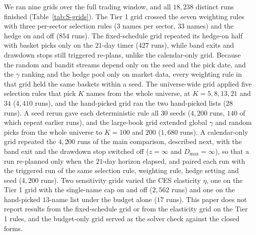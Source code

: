 We ran nine grids over the full trading window, and all $18{,}238$ distinct runs finished
(Table~\ref{tab:S-grids}). The Tier 1 grid crossed the seven weighting rules with three per-sector selection rules
($3$ names per sector, $33$ names) and the hedge on and off ($854$ runs). The fixed-schedule grid repeated its
hedge-on half with basket picks only on the $21$-day timer ($427$ runs), while band exits and drawdown stops still
triggered re-plans, unlike the calendar-only grid. Because the random and bandit streams depend
only on the seed and the pick date, and the $\gamma$ ranking and the hedge pool only on market data, every weighting
rule in that grid held the same baskets within a seed.
The universe-wide grid applied five selection rules that pick $K$ names from the whole universe, at
$K = 5, 8, 13, 21$ and $34$ ($4{,}410$ runs), and the hand-picked grid ran the two hand-picked lists ($28$ runs).
A seed rerun gave each deterministic rule all $30$ seeds ($4{,}200$ runs, $140$ of which repeat earlier runs), and
the large-book grid extended global $\gamma$ and random picks from the whole universe to $K = 100$ and $200$
($1{,}680$ runs).
A calendar-only grid repeated the $4{,}200$ runs of the main comparison, described next, with the band exit and the
drawdown stop switched off ($z = \infty$ and $D_{\max} = \infty$), so that a run re-planned only when the $21$-day
horizon elapsed, and paired each run with the triggered run of the same selection rule, weighting rule, hedge
setting and seed ($4{,}200$ runs).
Two sensitivity grids varied the CES elasticity $\eta$, one on the Tier 1 grid with the single-name cap on and off
($2{,}562$ runs) and one on the hand-picked $13$-name list under the budget alone ($17$ runs). This paper does not
report results from the fixed-schedule grid or from the elasticity grid on the Tier 1 rules, and the budget-only grid
served as the solver check against the closed forms.

